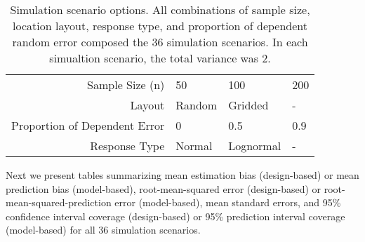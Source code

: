 \documentclass[]{elsarticle} %
\begin{document}
\begin{table}[ht]
\centering
\begin{tabular}{r|lll}
   \hline
Sample Size (n) & 50 & 100 & 200 \\ 
  Layout & Random & Gridded & - \\ 
  Proportion of Dependent Error & 0 & 0.5 & 0.9 \\ 
  Response Type & Normal & Lognormal & - \\ 
   \hline
\end{tabular}
\caption{\label{tab:parmtab} Simulation scenario options. All combinations of sample size, location layout, response type, and proportion of dependent random error composed the 36 simulation scenarios. In each simualtion scenario, the total variance was 2.} 
\end{table}

Next we present tables summarizing mean estimation bias (design-based)
or mean prediction bias (model-based), root-mean-squared error
(design-based) or root-mean-squared-prediction error (model-based), mean
standard errors, and 95\% confidence interval coverage (design-based) or
95\% prediction interval coverage (model-based) for all 36 simulation
scenarios.
\end{document}
